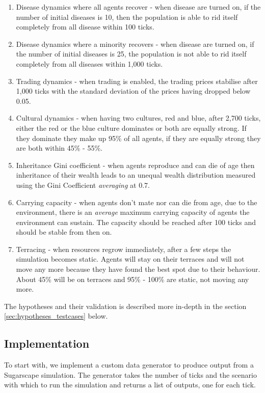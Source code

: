 \begin{enumerate}
	\item Disease dynamics where all agents recover - when disease are turned on, if the number of initial diseases is 10, then the population is  able to rid itself completely from all disease within 100 ticks. 
	
	\item Disease dynamics where a minority recovers - when disease are turned on, if the number of initial diseases is 25, the population is not able to rid itself completely from all diseases within 1,000 ticks.
	
	\item Trading dynamics - when trading is enabled, the trading prices stabilise after 1,000 ticks with the standard deviation of the prices having dropped below 0.05.
	
	\item Cultural dynamics - when having two cultures, red and blue, after 2,700 ticks, either the red or the blue culture dominates or both are equally strong. If they dominate they make up 95\% of all agents, if they are equally strong they are both within 45\% - 55\%.
	
	\item Inheritance Gini coefficient - when agents reproduce and can die of age then inheritance of their wealth leads to an unequal wealth distribution measured using the Gini Coefficient \textit{averaging} at 0.7.
	
	\item Carrying capacity - when agents don't mate nor can die from age, due to the environment, there is an \textit{average} maximum carrying capacity of agents the environment can sustain. The capacity should be reached after 100 ticks and should be stable from then on.
		
	\item Terracing - when resources regrow immediately, after a few steps the simulation becomes static. Agents will stay on their terraces and will not move any more because they have found the best spot due to their behaviour. About 45\% will be on terraces and 95\% - 100\% are static, not moving any more.
\end{enumerate}

The hypotheses and their validation is described more in-depth in the section \ref{sec:hypotheses_testcases} below.

\subsection{Implementation}
To start with, we implement a custom data generator to produce output from a Sugarscape simulation. The generator takes the number of ticks and the scenario with which to run the simulation and returns a list of outputs, one for each tick.

